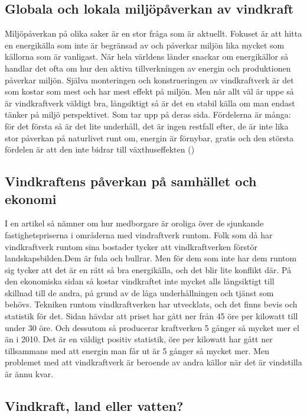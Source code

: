 \documentclass[11p]{article}
\begin{document}
    \subsection{Globala och lokala miljöpåverkan av vindkraft}
    Miljöpåverkan på olika saker är en stor fråga som är aktuellt.
    Fokuset är att hitta en energikälla som inte är begränsad av och påverkar miljön lika mycket som källorna som är vanligast.
    När hela världens länder snackar om energikällor så handlar det ofta om hur den aktiva tillverkningen av energin och produktionen påverkar miljön.
    Själva monteringen och konstrueringen av vindkraftverk är det som kostar som mest och har mest effekt på miljön.
    Men när allt väl är uppe så är vindkraftverk väldigt bra, långsiktigt så är det en stabil källa om man endast tänker på miljö perspektivet.
    Som\parencite{ugglansfysik} tar upp på deras sida.
    Fördelerna är många: för det första så är det lite underhåll, det är ingen restfall efter, de är inte lika stor påverkan på naturlivet runt om, energin är förnybar, gratis och den största fördelen är att den inte bidrar till växthuseffekten ()


    \subsection{Vindkraftens påverkan på samhället och ekonomi}
   I en artikel så nämner \textcite{divaportal} om hur medborgare är oroliga över de sjunkande fastighetspriserna i områderna med vindraftverk runtom.
    Folk som då har vindkraftverk runtom sina bostader tycker att vindkraftverken förstör landskapsbilden.Dem är fula och bullrar.
    Men för dem som inte har dem runtom sig tycker att det är en rätt så bra energikälla, och det blir lite konflikt där.
    På den ekonomiska sidan så kostar vindkraftet inte mycket alls långsiktigt till skillnad till de andra, på grund av de låga underhållningen och tjänst som behövs.
    Tekniken runtom vindkraftverken har utvecklats, och det finns bevis och statistik för det.
    Sidan \textcite{elektrikern} hävdar att priset har gått ner från 45 öre per kilowatt till under 30 öre.
    Och dessutom så producerar kraftverken 5 gånger så mycket mer el än i 2010.
    Det är en väldigt positiv statistik, öre per kilowatt har gått ner tillsammans med att energin man får ut är 5 gånger så mycket mer.
    Men problemet med att vindkraftverk är beroende av andra källor när det är vindstilla är ännu kvar.

    \subsection{Vindkraft, land eller vatten?}
\end{document}
